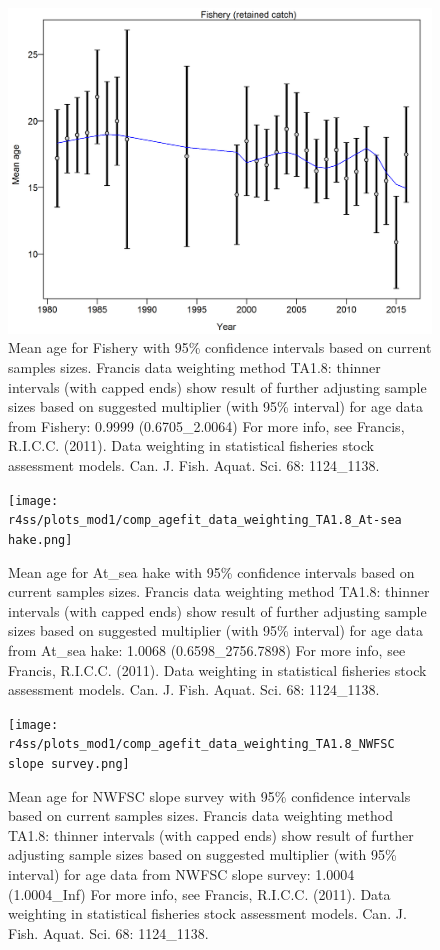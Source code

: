 \documentclass[12pt,]{article}
\begin{document}
\begin{figure}
\centering
\includegraphics{r4ss/plots_mod1/comp_agefit_data_weighting_TA1.8_Fishery.png}
\caption{Mean age for Fishery with 95\% confidence intervals based on
current samples sizes. Francis data weighting method TA1.8: thinner
intervals (with capped ends) show result of further adjusting sample
sizes based on suggested multiplier (with 95\% interval) for age data
from Fishery: 0.9999 (0.6705\_2.0064) For more info, see Francis,
R.I.C.C. (2011). Data weighting in statistical fisheries stock
assessment models. Can. J. Fish. Aquat. Sci. 68: 1124\_1138.
\label{fig:weighting_fishery}}
\end{figure}

\begin{figure}
\centering
\texttt{[image: r4ss/plots\_mod1/comp\_agefit\_data\_weighting\_TA1.8\_At-sea hake.png]}
\caption{Mean age for At\_sea hake with 95\% confidence intervals based
on current samples sizes. Francis data weighting method TA1.8: thinner
intervals (with capped ends) show result of further adjusting sample
sizes based on suggested multiplier (with 95\% interval) for age data
from At\_sea hake: 1.0068 (0.6598\_2756.7898) For more info, see
Francis, R.I.C.C. (2011). Data weighting in statistical fisheries stock
assessment models. Can. J. Fish. Aquat. Sci. 68: 1124\_1138.
\label{fig:weighting_ashop}}
\end{figure}

\begin{figure}
\centering
\texttt{[image: r4ss/plots\_mod1/comp\_agefit\_data\_weighting\_TA1.8\_NWFSC slope survey.png]}
\caption{Mean age for NWFSC slope survey with 95\% confidence intervals
based on current samples sizes. Francis data weighting method TA1.8:
thinner intervals (with capped ends) show result of further adjusting
sample sizes based on suggested multiplier (with 95\% interval) for age
data from NWFSC slope survey: 1.0004 (1.0004\_Inf) For more info, see
Francis, R.I.C.C. (2011). Data weighting in statistical fisheries stock
assessment models. Can. J. Fish. Aquat. Sci. 68: 1124\_1138.
\label{fig:weighting_nwfscslope}}
\end{figure}
\end{document}
